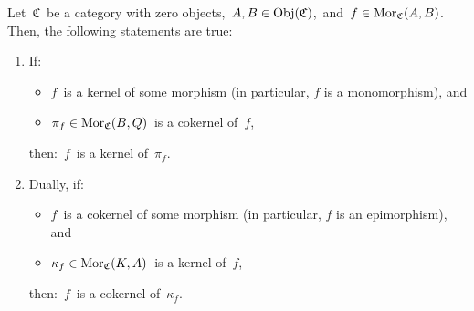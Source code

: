 \vskip 0.5cm
\begin{lemma}
\label{AKernelsTheKernelOfItsOwnCokernel}
\mbox{}
\vskip 0.1cm
\noindent
Let \,$\mathfrak{C}$\, be a category with zero objects,
\,$A, B \in \textnormal{Obj}(\mathfrak{C})$,\, and
\,$f \in \textnormal{Mor}_{\mathfrak{C}}(A,B)$.\,
\vskip 0.1cm
\noindent
Then, the following statements are true:
\begin{enumerate}
\item
	If:
	\begin{itemize}
	\item
		$f$\, is a kernel of some morphism (in particular, $f$ is a monomorphism), and
	\item
		$\pi_{f} \in \textnormal{Mor}_{\mathfrak{C}}(B,Q)$\, is a cokernel of \,$f$,
	\end{itemize}
	then: \,$f$\, is a kernel of \,$\pi_{f}$.
\item
	Dually, if:
	\begin{itemize}
	\item
		$f$\, is a cokernel of some morphism (in particular, $f$ is an epimorphism), and
	\item
		$\kappa_{f} \in \textnormal{Mor}_{\mathfrak{C}}(K,A)$\, is a kernel of \,$f$,
	\end{itemize}
	then: \,$f$\, is a cokernel of \,$\kappa_{f}$.
\end{enumerate}
\end{lemma}
\proof
